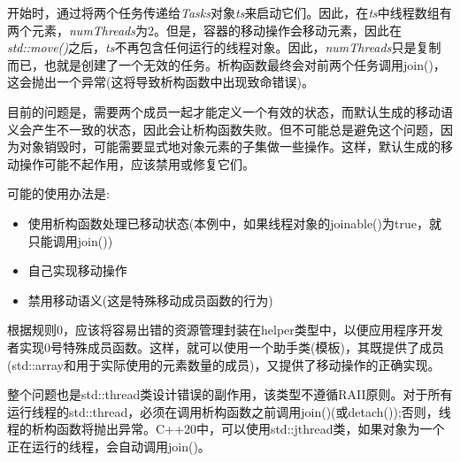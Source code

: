开始时，通过将两个任务传递给\textit{Tasks}对象\textit{ts}来启动它们。因此，在\textit{ts}中线程数组有两个元素，\textit{numThreads}为2。但是，容器的移动操作会移动元素，因此在\textit{std::move()}之后，\textit{ts}不再包含任何运行的线程对象。因此，\textit{numThreads}只是复制而已，也就是创建了一个无效的任务。析构函数最终会对前两个任务调用join()，这会抛出一个异常(这将导致析构函数中出现致命错误)。

目前的问题是，需要两个成员一起才能定义一个有效的状态，而默认生成的移动语义会产生不一致的状态，因此会让析构函数失败。但不可能总是避免这个问题，因为对象销毁时，可能需要显式地对象元素的子集做一些操作。这样，默认生成的移动操作可能不起作用，应该禁用或修复它们。

可能的使用办法是:

\begin{itemize}
	\item 使用析构函数处理已移动状态(本例中，如果线程对象的joinable()为true，就只能调用join())
	\item 自己实现移动操作
	\item 禁用移动语义(这是特殊移动成员函数的行为)
\end{itemize}

根据规则0，应该将容易出错的资源管理封装在helper类型中，以便应用程序开发者实现0号特殊成员函数。这样，就可以使用一个助手类(模板)，其既提供了成员(std::array和用于实际使用的元素数量的成员)，又提供了移动操作的正确实现。

整个问题也是std::thread类设计错误的副作用，该类型不遵循RAII原则。对于所有运行线程的std::thread，必须在调用析构函数之前调用join()(或detach());否则，线程的析构函数将抛出异常。C++20中，可以使用std::jthread类，如果对象为一个正在运行的线程，会自动调用join()。




















